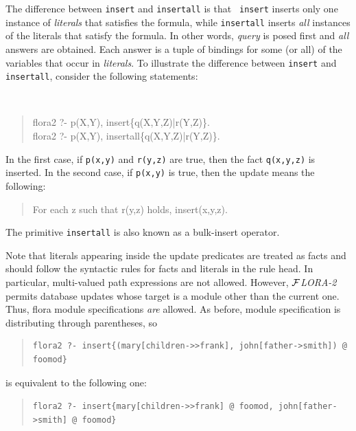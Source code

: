 \documentclass[11pt]{article}
\newcommand{\FLORA}{{\mbox{${\cal F}${\small\it LORA}\rm\emph{-2}}}\xspace}
\begin{document}
The difference between {\tt insert} and {\tt insertall} is that {\tt
  insert} inserts only one instance of \emph{literals} that satisfies the
formula, while {\tt insertall} inserts \emph{all} instances of the literals
that satisfy the formula. In other words, \emph{query} is posed first and
\emph{all} answers are obtained. Each answer is a tuple of bindings for
some (or all) of the variables that occur in \emph{literals}.  To
illustrate the difference between {\tt insert} and {\tt insertall},
consider the following statements:
{\tt
\begin{quote}
  flora2  ?- p(X,Y), insert\{q(X,Y,Z)|r(Y,Z)\}.\\
  flora2  ?- p(X,Y), insertall\{q(X,Y,Z)|r(Y,Z)\}.
\end{quote}
}
In the first case, if {\tt p(x,y)} and {\tt r(y,z)} are true, then the fact
{\tt q(x,y,z)} is inserted. In the second case, if {\tt p(x,y)} is true,
then the update means the following:
\begin{quote}
  For each z such that r(y,z) holds, insert(x,y,z).
\end{quote}
The primitive {\tt insertall} is also known as a bulk-insert operator.

Note that literals appearing inside the update predicates are treated as
facts and should follow the syntactic rules for facts and literals in the
rule head. In particular, multi-valued path expressions are not allowed.
However, \FLORA permits database updates whose target is a module other
than the current one.  Thus, flora module specifications \emph{are}
allowed. As before, module specification is distributing through
parentheses, so
\begin{quote}
\begin{verbatim}
flora2 ?- insert{(mary[children->>frank], john[father->smith]) @ foomod}
\end{verbatim}
\end{quote}
is equivalent to the following one:
\begin{quote}
\verb|flora2 ?- insert{mary[children->>frank] @ foomod, john[father->smith] @ foomod}|
\end{quote}
\end{document}
